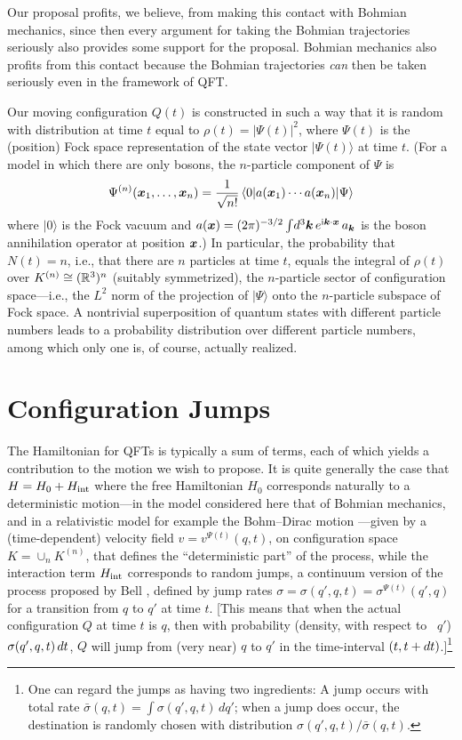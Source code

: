 \documentclass[12pt]{article}
\begin{document}
Our proposal profits, we believe, from making this contact with
Bohmian mechanics, since then every argument for taking the Bohmian
trajectories seriously also provides some support for the
proposal. Bohmian mechanics also profits from this contact because the
Bohmian trajectories \emph{can} then be taken seriously even in the
framework of QFT.

Our moving configuration $Q(t)$ is constructed in such a way that it is
random with distribution at time $t$ equal to $\rho(t)=|\Psi(t)|^2$, where
$\Psi(t)$ is the (position) Fock space representation of the state vector
$|\Psi(t)\rangle$ at time $t$. (For a model in which there are only bosons,
the $n$-particle component of $\Psi$ is
\begin{equation}\label{Fockfunction}
  \Psi^{(n)}(\boldsymbol{x}_1,\ldots,\boldsymbol{x}_n) = \frac{1}{\sqrt{n!}} \, \langle 0 |
  a(\boldsymbol{x}_1)\cdots a(\boldsymbol{x}_n) | \Psi\rangle 
\end{equation}
where $|0\rangle$ is the Fock vacuum and $a(\boldsymbol{x}) = (2\pi)^{-3/2} \int\!d^3
\boldsymbol k\, e^{\mathrm{i}\boldsymbol k\cdot\boldsymbol{x}} \, a_{\boldsymbol k}$ is the boson annihilation operator at
position $\boldsymbol{x}$.)  In particular, the probability that $N(t)=n$, i.e., that
there are $n$ particles at time $t$, equals the integral of $\rho(t)$ over
$K^{(n)}\cong (\mathbb{R}^3)^n$ (suitably symmetrized), the $n$-particle sector
of configuration space---i.e., the $L^2$ norm of the projection of
$|\Psi\rangle$ onto the $n$-particle subspace of Fock space. A nontrivial
superposition of quantum states with different particle numbers leads to a
probability distribution over different particle numbers, among which only
one is, of course, actually realized.


\section{Configuration Jumps}

The Hamiltonian for QFTs is typically a sum of terms, each of which yields
a contribution to the motion we wish to propose. It is quite generally the
case that $H=H_0+H_{\mathrm{int}}$ where the free Hamiltonian $H_0$ corresponds
naturally to a deterministic motion---in the model considered here that of
Bohmian mechanics, and in a relativistic model for example the Bohm--Dirac
motion \cite[p.~274]{BH}---given by a (time-dependent) velocity field
$v=v^{\Psi(t)}(q,t)$, on configuration space $K=\cup_n K^{(n)}$, that
defines the ``deterministic part'' of the process, while the interaction
term $H_{\mathrm{int}}$ corresponds to random jumps, a continuum version of the
process proposed by Bell \cite[p.~173]{BellBible}, defined by jump rates
$\sigma=\sigma(q',q,t)=\sigma^{\Psi(t)}(q',q)$ for a transition from $q$ to
$q'$ at time $t$. [This means that when the actual configuration $Q$ at
time $t$ is $q$, then with probability (density, with respect to \ $q'$) 
$\sigma(q',q,t) \,d t$, $Q$
will jump from (very near) $q$ to $q'$ in the time-interval
$(t,t+d t)$.]\footnote{One can regard the jumps as having two ingredients: A
jump occurs with total rate $\bar\sigma(q,t)=\int \sigma(q',q,t)\,dq'$;
when a jump does occur, the destination is randomly chosen with
distribution $\sigma(q',q,t)/\bar\sigma(q,t)$.}
\end{document}

